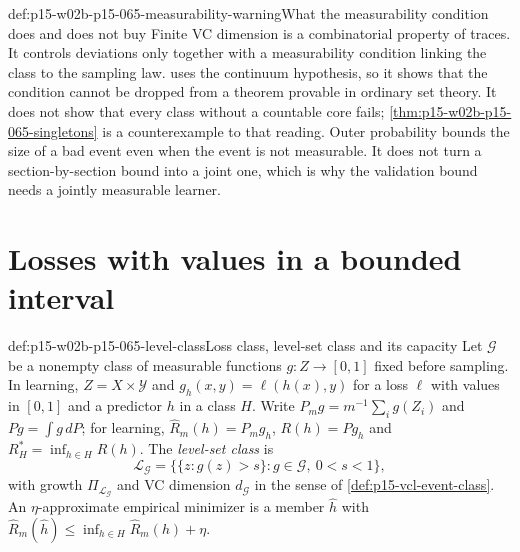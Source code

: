 \begin{hbwarning}{def:p15-w02b-p15-065-measurability-warning}{What the measurability condition does and does not buy}
Finite VC dimension is a combinatorial property of traces. It controls
deviations only together with a measurability condition linking the class
to the sampling law.  uses the
continuum hypothesis, so it shows that the condition cannot be dropped from
a theorem provable in ordinary set theory. It does not show that every
class without a countable core fails;
\cref{thm:p15-w02b-p15-065-singletons} is a counterexample to that
reading. Outer probability bounds the size of a bad event even when the
event is not measurable. It does not turn a section-by-section bound into
a joint one, which is why the validation bound needs a jointly measurable
learner.
\end{hbwarning}

\section{Losses with values in a bounded interval}
\label{sec:p15-w02b-p15-065-real}

\begin{hbdefinition}{def:p15-w02b-p15-065-level-class}{Loss class, level-set class and its capacity}
Let \(\mathcal G\) be a nonempty class of measurable functions
\(g:Z\to[0,1]\) fixed before sampling. In learning, \(Z=X\times\mathcal Y\)
and \(g_h(x,y)=\ell(h(x),y)\) for a loss \(\ell\) with values in \([0,1]\)
and a predictor \(h\) in a class \(H\). Write
\(P_mg=m^{-1}\sum_ig(Z_i)\) and \(Pg=\int g\,dP\); for learning,
\(\widehat R_m(h)=P_mg_h\), \(R(h)=Pg_h\) and
\(R_H^{*}=\inf_{h\in H}R(h)\). The \emph{level-set class} is
\[
 \mathcal L_{\mathcal G}=\{\{z:g(z)>s\}:g\in\mathcal G,\ 0<s<1\},
\]
with growth \(\Pi_{\mathcal L_{\mathcal G}}\) and VC dimension
\(d_{\mathcal G}\) in the sense of \cref{def:p15-vcl-event-class}.
An \(\eta\)-approximate empirical minimizer is a member \(\widehat h\) with
\(\widehat R_m(\widehat h)\leq\inf_{h\in H}\widehat R_m(h)+\eta\).
\end{hbdefinition}

